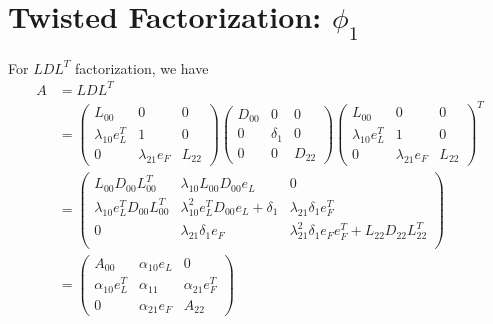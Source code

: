 \documentclass[11pt,a4paper]{article}
\begin{document}
\section{Twisted Factorization: $\phi_1$}
\newcommand{\AAA}{\left( \begin{array}{ccc}
        A_{00} & \alpha_{10} e_L & 0 \\
        \alpha_{10} e_L^T & \alpha_{11} & \alpha_{21} e_F^T \\
        0 & \alpha_{21} e_F & A_{22}
    \end{array} \right)}
\newcommand{\LLL}{\left( \begin{array}{ccc}
        L_{00} & 0 & 0 \\
        \lambda_{10} e_L^T & 1 & 0 \\
        0 & \lambda_{21} e_F & L_{22}
    \end{array} \right)}
 \newcommand{\UUU}{\left( \begin{array}{ccc}
             U_{00} & v_{01}e_L & 0 \\
             0 & 1 & v_{21} e_F^T \\
             0 & 0 & U_{22}
    \end{array} \right)}
\newcommand{\DDD}{\left( \begin{array}{ccc}
        D_{00} & 0 & 0 \\
        0 & \delta_1 & 0 \\
        0 & 0 & D_{22}
    \end{array} \right)}
\newcommand{\EEE}{\left( \begin{array}{ccc}
        E_{00} & 0 & 0 \\
        0 & \epsilon_1 & 0 \\
        0 & 0 & E_{22}
    \end{array} \right)}
For $LDL^T$ factorization, we have 
\begin{align}
    A &= L D L^T \nonumber \\
    &= \LLL \DDD \LLL^T  \nonumber \\
    &= \left( \begin{array}{ccc}
            L_{00} D_{00} L_{00}^T & \lambda_{10} L_{00} D_{00} e_L & 0 \\
        \lambda_{10} e_L^T D_{00} L_{00}^T & \lambda_{10}^2 e_L^T D_{00} e_L +
        \delta_1 & \lambda_{21} \delta_1 e_F^T \\
        0 & \lambda_{21} \delta_{1} e_F & \lambda_{21}^2 \delta_1 e_F e_F^T +
        L_{22} D_{22} L_{22}^T \\
    \end{array} \right) \\
    & = \AAA
\end{align}
\end{document}
